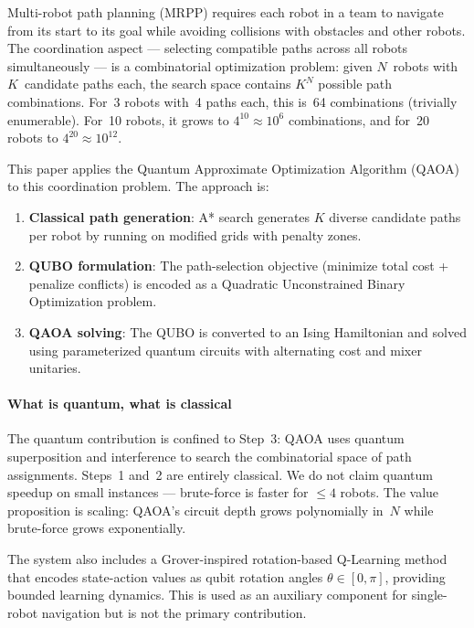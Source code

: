 \documentclass[conference]{IEEEtran}
\begin{document}
Multi-robot path planning (MRPP) requires each robot in a team to navigate from its start to its goal while avoiding collisions with obstacles and other robots. The coordination aspect --- selecting compatible paths across all robots simultaneously --- is a combinatorial optimization problem: given $N$~robots with $K$~candidate paths each, the search space contains $K^N$ possible path combinations. For~3 robots with~4 paths each, this is~64 combinations (trivially enumerable). For~10 robots, it grows to $4^{10} \approx 10^6$ combinations, and for~20 robots to $4^{20} \approx 10^{12}$.

This paper applies the Quantum Approximate Optimization Algorithm (QAOA)~\cite{farhi2014qaoa} to this coordination problem. The approach is:

\begin{enumerate}
    \item \textbf{Classical path generation}: A* search generates $K$ diverse candidate paths per robot by running on modified grids with penalty zones.
    \item \textbf{QUBO formulation}: The path-selection objective (minimize total cost + penalize conflicts) is encoded as a Quadratic Unconstrained Binary Optimization problem.
    \item \textbf{QAOA solving}: The QUBO is converted to an Ising Hamiltonian and solved using parameterized quantum circuits with alternating cost and mixer unitaries.
\end{enumerate}

\paragraph{What is quantum, what is classical}
The quantum contribution is confined to Step~3: QAOA uses quantum superposition and interference to search the combinatorial space of path assignments. Steps~1 and~2 are entirely classical. We do not claim quantum speedup on small instances --- brute-force is faster for $\leq4$ robots. The value proposition is scaling: QAOA's circuit depth grows polynomially in~$N$ while brute-force grows exponentially.

The system also includes a Grover-inspired rotation-based Q-Learning method~\cite{dong2008quantum} that encodes state-action values as qubit rotation angles $\theta \in [0, \pi]$, providing bounded learning dynamics. This is used as an auxiliary component for single-robot navigation but is not the primary contribution.
\end{document}
